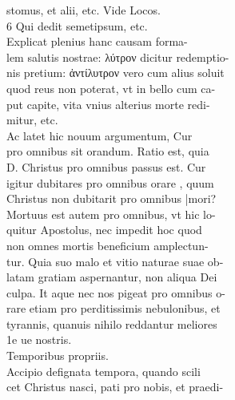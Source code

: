 \documentclass{article}
\begin{document}
\begin{pages}
                stomus, et alii, etc. Vide Locos. \\
                6 Qui dedit semetipsum, etc. \\
                Explicat plenius hanc causam forma- \\
                lem salutis nostrae: λύτρον dicitur redemptio- \\
                nis pretium: ἀντίλυτρον vero cum alius soluit \\
                quod reus non poterat, vt in bello cum ca- \\
                put capite, vita vnius alterius morte redi- \\
                mitur, etc. \\
                Ac latet hic nouum argumentum, Cur \\
                pro omnibus sit orandum. Ratio est, quia \\
                D. Christus pro omnibus passus est. Cur \\
                igitur dubitares pro omnibus orare , quum \\
                Christus non dubitarit pro omnibus |mori? \\
                Mortuus est autem pro omnibus, vt hic lo- \\
                quitur Apostolus, nec impedit hoc quod \\
                non omnes mortis beneficium amplectun- \\
                tur. Quia suo malo et vitio naturae suae ob- \\
                latam gratiam aspernantur, non aliqua Dei \\
                culpa. It aque nec nos pigeat pro omnibus o- \\
                rare etiam pro perditissimis nebulonibus, et \\
                tyrannis, quanuis nihilo reddantur meliores \\
                1e ue nostris. \\
                Temporibus propriis. \\
                Accipio defignata tempora, quando scili \\
                cet Christus nasci, pati pro nobis, et praedi- \\

\end{pages}
\end{document}

